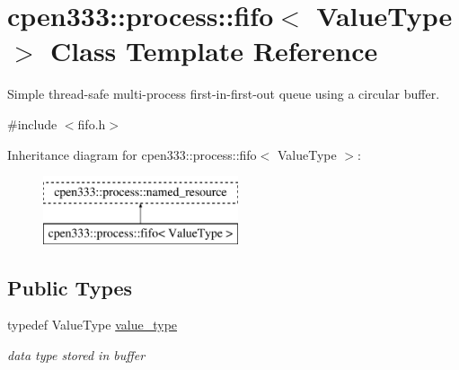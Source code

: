 \hypertarget{classcpen333_1_1process_1_1fifo}{}\section{cpen333\+:\+:process\+:\+:fifo$<$ Value\+Type $>$ Class Template Reference}
\label{classcpen333_1_1process_1_1fifo}


Simple thread-\/safe multi-\/process first-\/in-\/first-\/out queue using a circular buffer.  




{\ttfamily \#include $<$fifo.\+h$>$}

Inheritance diagram for cpen333\+:\+:process\+:\+:fifo$<$ Value\+Type $>$\+:\begin{figure}[H]
\begin{center}
\leavevmode
\includegraphics[height=2.000000cm]{classcpen333_1_1process_1_1fifo}
\end{center}
\end{figure}
\subsection*{Public Types}
\begin{DoxyCompactItemize}
\item 
\mbox{\label{classcpen333_1_1process_1_1fifo_abc26c9f811226c81d390bd32dd4a3a53}} 
typedef Value\+Type \hyperlink{classcpen333_1_1process_1_1fifo_abc26c9f811226c81d390bd32dd4a3a53}{value\+\_\+type}
\begin{DoxyCompactList}\small\item\em data type stored in buffer \end{DoxyCompactList}\end{DoxyCompactItemize}
